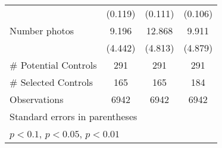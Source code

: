 {\begin{tabular}{l*{3}{c}}
                    &     (0.119)         &     (0.111)         &     (0.106)         \\
[1em]
Number photos       &       9.196\sym{**} &      12.868\sym{***}&       9.911\sym{**} \\
                    &     (4.442)         &     (4.813)         &     (4.879)         \\
\hline
# Potential Controls&         291         &         291         &         291         \\
# Selected Controls &         165         &         165         &         184         \\
Observations        &        6942         &        6942         &        6942         \\
\hline\hline
\multicolumn{4}{l}{\footnotesize Standard errors in parentheses}\\
\multicolumn{4}{l}{\footnotesize \sym{*} \(p<0.1\), \sym{**} \(p<0.05\), \sym{***} \(p<0.01\)}\\
\end{tabular}
}
